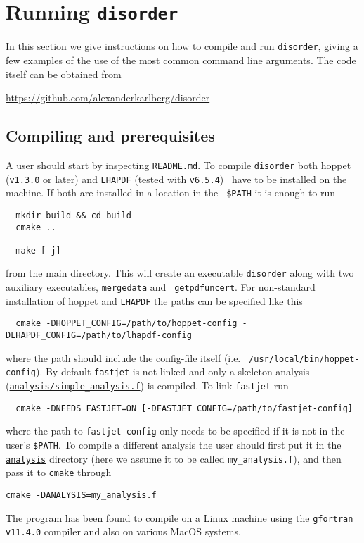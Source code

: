 \documentclass[submission, PhysCodeb]{SciPost_better_arXiv}
\newcommand{\hoppet}{{\sc hoppet}}
\newcommand{\disorder}{{\tt disorder}}
\newcommand{\fastjet}{{\tt fastjet}}
\newcommand{\lhapdf}{{\tt LHAPDF}}
\newcommand{\ttt}[1]{\texttt{#1}}
\newcommand{\repolink}[2]{\href{https://github.com/alexanderkarlberg/disorder/blob/master/#1}{\ttt{#2}}}
\newcommand{\masterlink}[1]{\repolink{#1}{#1}}
\begin{document}
\section{Running \disorder{}}
\label{sec:running}
In this section we give instructions on how to compile and run
\disorder{}, giving a few examples of the use of the most common
command line arguments. The code itself can be obtained from

\begin{center}\url{https://github.com/alexanderkarlberg/disorder}\end{center}

\subsection{Compiling and prerequisites}
A user should start by inspecting \masterlink{README.md}. To compile
\disorder{} both \hoppet{} ({\tt v1.3.0} or later) and \lhapdf{}
(tested with {\tt v6.5.4})~\cite{Buckley:2014ana} have to be installed
on the machine. If both are installed in a location in the {\tt
  \$PATH} it is enough to run
\begin{lstlisting}
  mkdir build && cd build
  cmake ..

  make [-j]
\end{lstlisting}
from the main directory. This will create an executable \disorder{}
along with two auxiliary executables, {\tt mergedata} and {\tt
  getpdfuncert}. For non-standard installation of \hoppet{} and
\lhapdf{} the paths can be specified like this
\begin{lstlisting}
  cmake -DHOPPET_CONFIG=/path/to/hoppet-config -DLHAPDF_CONFIG=/path/to/lhapdf-config
\end{lstlisting}
where the path should include the config-file itself (i.e. {\tt
  /usr/local/bin/hoppet-config}). By default \fastjet{} is not linked
and only a skeleton analysis
(\masterlink{analysis/simple\_analysis.f}) is compiled. To link
\fastjet{} run
\begin{lstlisting}
  cmake -DNEEDS_FASTJET=ON [-DFASTJET_CONFIG=/path/to/fastjet-config]
\end{lstlisting}
where the path to {\tt fastjet-config} only needs to be specified if
it is not in the user's {\tt \$PATH}. To compile a different analysis
the user should first put it in the \masterlink{analysis} directory (here we
assume it to be called {\tt my\_analysis.f}), and then pass it to
{\tt cmake} through
\begin{lstlisting}
cmake -DANALYSIS=my_analysis.f
\end{lstlisting}
The program has been found to compile on a Linux machine using the
{\tt gfortran v11.4.0} compiler and also on various MacOS systems.
\end{document}
